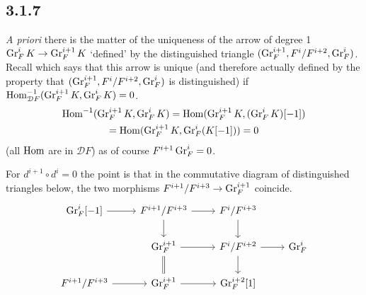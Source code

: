 \documentclass[deligne.tex]{subfiles}
\begin{document}
\subsection*{3.1.7}\label{BBD:3.1.7}
\emph{A priori} there is the matter of the uniqueness of the arrow of
degree 1 $\operatorname{Gr}_F^iK\rightarrow\operatorname{Gr}_F^{i+1}K$ `defined' by the distinguished triangle
$(\operatorname{Gr}_F^{i+1},F^i/F^{i+2},\operatorname{Gr}_F^i)$.
Recall \cite[1.1.10]{BBD} which says that this arrow is unique
(and therefore actually defined by the property that
$(\operatorname{Gr}_F^{i+1},F^i/F^{i+2},\operatorname{Gr}_F^i)$ is distinguished) if
$\operatorname{Hom}^{-1}_{\mathcal DF}(\operatorname{Gr}_F^{i+1}K,\operatorname{Gr}^i_FK)=0$.
\begin{multline*}
	\operatorname{Hom}^{-1}(\operatorname{Gr}_F^{i+1}K,\operatorname{Gr}^i_FK)=\operatorname{Hom}(\operatorname{Gr}_F^{i+1}K,(\operatorname{Gr}^i_FK)[-1]) \\
	=\operatorname{Hom}(\operatorname{Gr}_F^{i+1}K,\operatorname{Gr}^i_F(K[-1]))=0
\end{multline*}
(all $\operatorname{Hom}$ are in $\mathcal DF$) as of course $F^{i+1}\operatorname{Gr}^i_F=0$.

For $d^{i+1}\circ d^i=0$ the point is that in the commutative 
diagram of distinguished triangles below, the two morphisms
$F^{i+1}/F^{i+3}\rightarrow\operatorname{Gr}_F^{i+1}$ coincide.
\begin{equation*}\begin{tikzcd}
	\Gr_F^i[-1]\arrow[r]&F^{i+1}/F^{i+3}\arrow[r]\arrow[d]
	&F^i/F^{i+3}\arrow[d] \\
	&\Gr_F^{i+1}\arrow[r]\arrow[d,equals]&F^i/F^{i+2}\arrow[r]\arrow[d]
	&\Gr_F^i \\
	F^{i+1}/F^{i+3}\arrow[r]&\Gr_F^{i+1}\arrow[r]&\Gr_F^{i+2}[1]
\end{tikzcd}\end{equation*}
\end{document}
